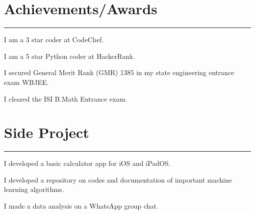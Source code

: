 \documentclass[]{debjitpal-resume}
\begin{document}
\begin{minipage}[t]{0.6\textwidth}
\section{Achievements/Awards} 
\noindent\rule{12.5cm}{0.4pt}
 
\noindent
\hspace{4em}%
\begin{minipage}{0.85\textwidth\vspace{2pt}}
I am a 3 star coder at CodeChef.
\end{minipage}
 
\noindent
\hspace{4em}%
\begin{minipage}{0.85\textwidth\vspace{2pt}}
I am a 5 star Python coder at HackerRank.
\end{minipage}
 
\noindent
\hspace{4em}%
\begin{minipage}{0.85\textwidth\vspace{2pt}}
I secured General Merit Rank (GMR) 1385 in my state engineering entrance exam WBJEE.
\end{minipage}
 
\noindent
\hspace{4em}%
\begin{minipage}{0.85\textwidth\vspace{2pt}}
I cleared the ISI B.Math Entrance exam.
\end{minipage}
\section{Side Project}
\noindent\rule{12.5cm}{0.4pt}
 
\noindent
\hspace{4em}%
\begin{minipage}{0.85\textwidth\vspace{5pt}}
I developed a basic calculator app for iOS and iPadOS.
\end{minipage}
 
\noindent
\hspace{4em}%
\begin{minipage}{0.85\textwidth\vspace{5pt}}
I developed a repository on codes and documentation of important machine learning algorithms.
\end{minipage}
 
\noindent
\hspace{4em}%
\begin{minipage}{0.85\textwidth\vspace{5pt}}
I made a data analysis on a WhatsApp group chat.
\end{minipage}
\end{minipage} 
\end{document}
